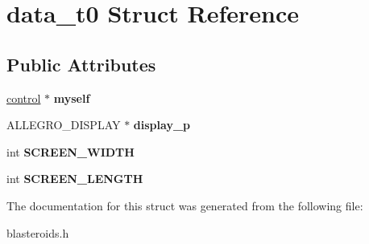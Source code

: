 \hypertarget{structdata__t0}{}\section{data\+\_\+t0 Struct Reference}
\label{structdata__t0}
\subsection*{Public Attributes}
\begin{DoxyCompactItemize}
\item 
\hypertarget{structdata__t0_a1fced4f673fcb8e34d5da65a09133d91}{}\hyperlink{structcontrol}{control} $\ast$ {\bfseries myself}\label{structdata__t0_a1fced4f673fcb8e34d5da65a09133d91}

\item 
\hypertarget{structdata__t0_a7da371377a53f8be029b93084668e4e4}{}A\+L\+L\+E\+G\+R\+O\+\_\+\+D\+I\+S\+P\+L\+A\+Y $\ast$ {\bfseries display\+\_\+p}\label{structdata__t0_a7da371377a53f8be029b93084668e4e4}

\item 
\hypertarget{structdata__t0_a5cc8764f11635f8471b81634250119e1}{}int {\bfseries S\+C\+R\+E\+E\+N\+\_\+\+W\+I\+D\+T\+H}\label{structdata__t0_a5cc8764f11635f8471b81634250119e1}

\item 
\hypertarget{structdata__t0_af5b02ccdaa133affbdf6921958db1b52}{}int {\bfseries S\+C\+R\+E\+E\+N\+\_\+\+L\+E\+N\+G\+T\+H}\label{structdata__t0_af5b02ccdaa133affbdf6921958db1b52}

\end{DoxyCompactItemize}


The documentation for this struct was generated from the following file\+:\begin{DoxyCompactItemize}
\item 
blasteroids.\+h\end{DoxyCompactItemize}
